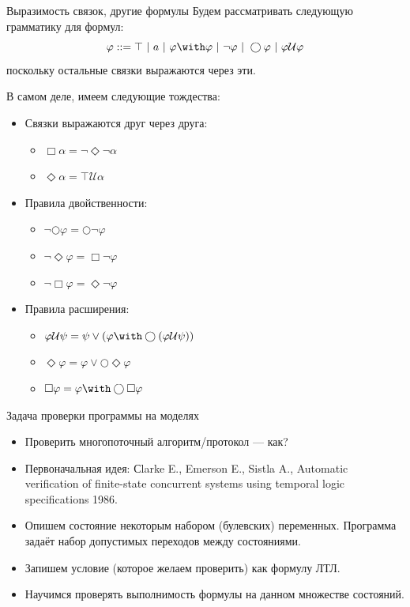 \documentclass[aspectratio=169,dvipsnames,usenames]{beamer}
\begin{document}
\begin{frame}{Выразимость связок, другие формулы}
Будем рассматривать следующую грамматику для формул: 
$$\varphi ::= \top\ |\ a\ |\ \varphi\with\varphi\ |\ \neg\varphi\ |\ \bigcirc\varphi\ |\ \varphi\mathcal{U}\varphi$$
поскольку остальные связки выражаются через эти. 

В самом деле, имеем следующие тождества:
\begin{itemize}
\item Связки выражаются друг через друга:
\begin{itemize}
\item $\Box\alpha = \neg\Diamond\neg\alpha$
\item $\Diamond\alpha = \top \mathcal{U} \alpha$
\end{itemize}
\item Правила двойственности:
\begin{itemize}
\item $\neg\bigcirc\varphi=\bigcirc\neg\varphi$
\item $\neg\Diamond\varphi = \Box\neg\varphi$
\item $\neg\Box\varphi = \Diamond\neg\varphi$
\end{itemize}
\item Правила расширения:
\begin{itemize}
\item $\varphi\mathcal{U}\psi = \psi \vee (\varphi \with \bigcirc (\varphi \mathcal{U} \psi))$
\item $\Diamond \varphi = \varphi \vee \bigcirc \Diamond \varphi$
\item $\Box \varphi = \varphi \with \bigcirc \Box \varphi$
\end{itemize}
\end{itemize}
\end{frame}

\begin{frame}{Задача проверки программы на моделях}
\begin{itemize}
\item Проверить многопоточный алгоритм/протокол --- как?
\item Первоначальная идея: Сlarke E., Emerson E., Sistla A., Automatic veriﬁcation of ﬁnite-state 
concurrent systems using temporal logic speciﬁcations 
1986.
\item Опишем состояние некоторым набором (булевских) переменных.
Программа задаёт набор допустимых переходов между состояниями.
\item Запишем условие (которое желаем проверить) как формулу ЛТЛ.
\item Научимся проверять выполнимость формулы на данном множестве состояний.
\end{itemize}
\end{frame}
\end{document}
